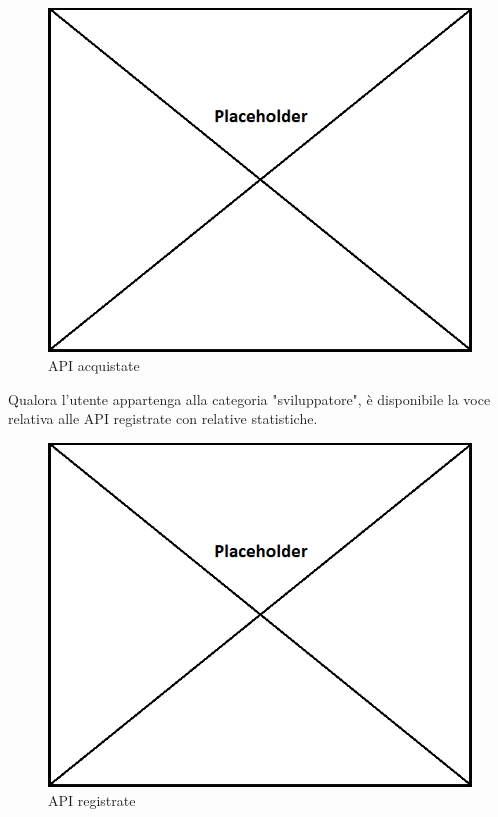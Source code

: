 \label{API acquistate}
\begin{figure}[H]
	\centering
	\includegraphics[scale=0.45]{img/placeholder.png}
	\caption{API acquistate}
\end{figure}

Qualora l'utente appartenga alla categoria "sviluppatore", è disponibile la voce relativa alle API registrate con relative statistiche.

\label{API registrate}
\begin{figure}[H]
	\centering
	\includegraphics[scale=0.45]{img/placeholder.png}
	\caption{API registrate}
\end{figure}

